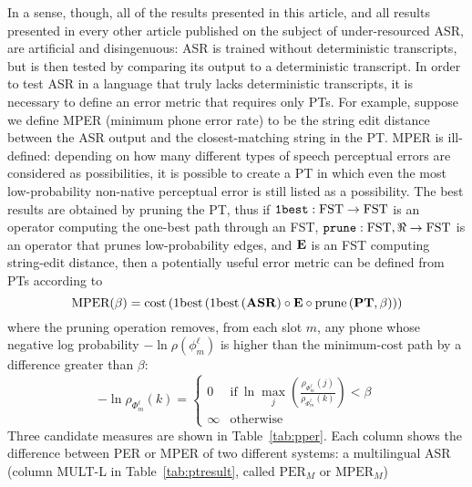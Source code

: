 
In a sense, though, all of the results presented in this article, and
all results presented in every other article published on the subject
of under-resourced ASR, are artificial and disingenuous: ASR is
trained without deterministic transcripts, but is then tested by
comparing its output to a deterministic transcript.  In order to test
ASR in a language that truly lacks deterministic transcripts, it is
necessary to define an error metric that requires only PTs.  For
example, suppose we define MPER (minimum phone error rate) to be the
string edit distance between the ASR output and the closest-matching
string in the PT.  MPER is ill-defined: depending on how many
different types of speech perceptual errors are considered as
possibilities, it is possible to create a PT in which even the most
low-probability non-native perceptual error is still listed as a
possibility.  The best results are obtained by pruning the PT, thus if
${\tt 1best}:\mbox{FST}\rightarrow\mbox{FST}$ is an operator computing
the one-best path through an FST, ${\tt
  prune}:\mbox{FST},\Re\rightarrow\mbox{FST}$ is an operator that
prunes low-probability edges, and ${\bf E}$ is an FST computing
string-edit distance, then a potentially useful error metric can be
defined from PTs according to
\begin{equation}
  \mbox{MPER}(\beta) = \mathrm{cost}
  \left(\mathrm{1best}
  \left(\mathrm{1best}
  \left({\bf ASR}\right)
  \circ{\bf E}\circ\mathrm{prune}
  \left({\bf PT},\beta\right)
  \right)
  \right)
\end{equation}
where the pruning operation removes, from each slot $m$, any phone
whose negative log probability $-\ln\rho(\phi_m^\ell)$ is higher than
the minimum-cost path by a difference greater than $\beta$:
\begin{equation}
-\ln\hat{\rho}_{\Phi_m^\ell}(k) = \left\{\begin{array}{ll}
0 & \mbox{if}~\ln\max_j \left(\frac{\rho_{\Phi_m^\ell}(j)}
    {\rho_{\Phi_m^\ell}(k)}\right) < \beta \\
    \infty & \mbox{otherwise}
    \end{array}\right.
\label{eq:pper}
\end{equation}
Three candidate measures are shown in Table~\ref{tab:pper}.  Each
column shows the difference between PER or MPER of two different
systems: a multilingual ASR (column {\sc MULT-L} in
Table~\ref{tab:ptresult}, called $\mbox{PER}_M$ or $\mbox{MPER}_M$)
